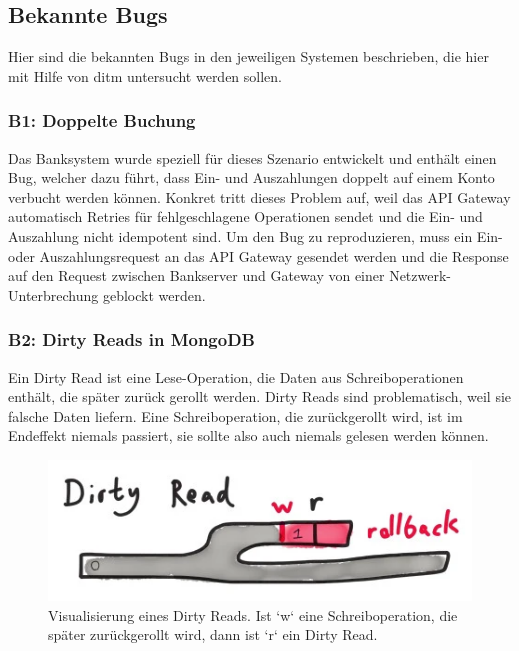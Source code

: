 \documentclass[12pt,a4paper]{report}
\begin{document}
\subsection{Bekannte Bugs}
Hier sind die bekannten Bugs in den jeweiligen Systemen beschrieben, die hier mit Hilfe von ditm untersucht werden sollen.

\subsubsection{B1: Doppelte Buchung}
Das Banksystem wurde speziell für dieses Szenario entwickelt und enthält einen Bug, welcher dazu führt, dass Ein- und Auszahlungen
doppelt auf einem Konto verbucht werden können. Konkret tritt dieses Problem auf, weil das API Gateway automatisch Retries für
fehlgeschlagene Operationen sendet und die Ein- und Auszahlung nicht idempotent sind. Um den Bug zu reproduzieren, muss ein Ein-
oder Auszahlungsrequest an das API Gateway gesendet werden und die Response auf den Request zwischen Bankserver und Gateway
von einer Netzwerk-Unterbrechung geblockt werden.

\subsubsection{B2: Dirty Reads in MongoDB}
Ein Dirty Read ist eine Lese-Operation, die Daten aus Schreiboperationen enthält, die später zurück gerollt werden. Dirty Reads
sind problematisch, weil sie falsche Daten liefern. Eine Schreiboperation, die zurückgerollt wird, ist im Endeffekt niemals
passiert, sie sollte also auch niemals gelesen werden können. \cite{jepsen_mongo_analysis}

\begin{figure}[H]
	\centering
	\includegraphics[width=0.7\linewidth]{img/dirty_read.png}
	\caption{Visualisierung eines Dirty Reads. Ist `w` eine Schreiboperation, die später zurückgerollt wird, dann ist `r` ein
		Dirty Read. \cite{jepsen_mongo_analysis}}
	\label{fig:dirty_read}
\end{figure}
\end{document}
